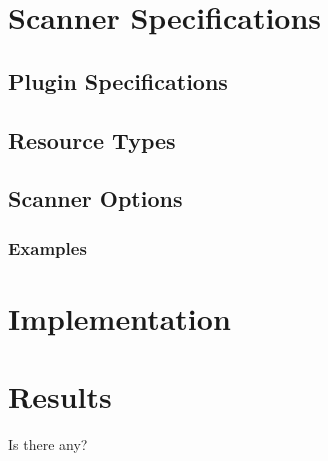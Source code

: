 \section{Scanner Specifications}

\subsection{Plugin Specifications}
\subsection{Resource Types}
\subsection{Scanner Options}
\subsubsection{Examples}

\section{Implementation}
\section{Results}
Is there any?



